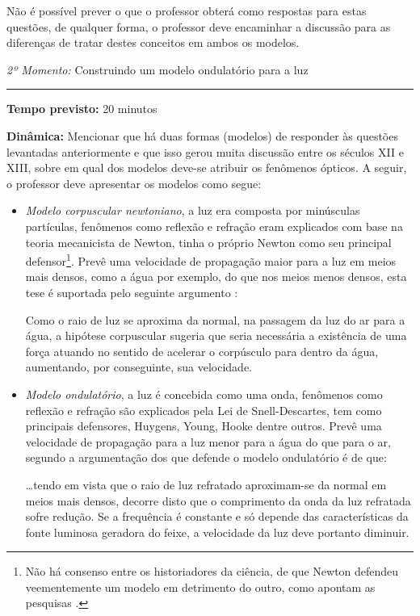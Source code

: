    Não é possível prever o que o professor obterá como respostas para estas questões, de qualquer forma, o professor deve encaminhar a discussão para as diferenças de tratar destes conceitos em ambos os modelos.

    \vspace{50pt}
    \noindent \emph{2º Momento:} Construindo um modelo ondulatório para a luz
	\par\noindent\rule{.3\textwidth}{.5pt}    
    \par\noindent \textbf{Tempo previsto: }20 minutos
	

    \noindent \textbf{Dinâmica:} Mencionar que há duas formas (modelos) de responder às questões levantadas anteriormente e que isso gerou muita discussão entre os séculos XII e XIII, sobre em qual dos modelos deve-se atribuir os fenômenos ópticos. A seguir, o professor deve apresentar os modelos como segue:

    \begin{itemize}
        \item \emph{Modelo corpuscular newtoniano}, a luz era composta por minúsculas partículas, fenômenos como reflexão e refração eram explicados com base na teoria mecanicista de Newton, tinha o próprio Newton como seu principal defensor\footnote{Não há consenso entre os historiadores da ciência, de que Newton defendeu veementemente um modelo em detrimento do outro, como apontam as pesquisas \cite{FELIPHE:2019,FABIO:2009,YOUNG:1801}.}. Prevê uma velocidade de propagação maior para a luz em meios mais densos, como a água por exemplo, do que nos meios menos densos, esta tese é suportada pelo seguinte argumento \cite{PEDUZZI:2022}:
        
        \begin{citacao}
            Como o raio de luz se aproxima da normal, na passagem da luz do ar para a água, a hipótese corpuscular sugeria que seria necessária a existência de uma força atuando no sentido de acelerar o corpúsculo para dentro da água, aumentando, por conseguinte, sua velocidade. 
        \end{citacao}
        
        \item \emph{Modelo ondulatório}, a luz é concebida como uma onda, fenômenos como reflexão e refração são explicados pela Lei de Snell-Descartes, tem como principais defensores, Huygens, Young, Hooke dentre outros. Prevê uma velocidade de propagação para a luz menor para a água do que para o ar, segundo \cite{PEDUZZI:2022} a argumentação dos que defende o modelo ondulatório é de que:
        
        \begin{citacao}
            \ldots tendo em vista que o raio de luz refratado aproximam-se da normal em meios mais densos, decorre disto que o comprimento da onda da luz refratada sofre redução. Se a frequência é constante e só depende das características da fonte luminosa geradora do feixe, a velocidade da luz deve portanto diminuir.
        \end{citacao}
    \end{itemize}

